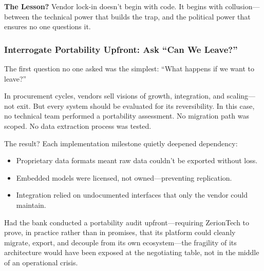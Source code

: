 \textbf{The Lesson?} Vendor lock-in doesn’t begin with code. It begins with collusion—between the technical power that builds the trap, and the political power that ensures no one questions it.


\subsubsection{Interrogate Portability Upfront: Ask “Can We Leave?”}

The first question no one asked was the simplest: “What happens if we want to leave?”  

In procurement cycles, vendors sell visions of growth, integration, and scaling—not exit. But every system should be evaluated for its reversibility. In this case, no technical team performed a portability assessment. No migration path was scoped. No data extraction process was tested.  

The result? Each implementation milestone quietly deepened dependency:  
\begin{itemize}
    \item Proprietary data formats meant raw data couldn’t be exported without loss.
    \item Embedded models were licensed, not owned—preventing replication.
    \item Integration relied on undocumented interfaces that only the vendor could maintain.
\end{itemize}

Had the bank conducted a portability audit upfront—requiring ZerionTech to prove, in practice rather than in promises, that its platform could cleanly migrate, export, and decouple from its own ecosystem—the fragility of its architecture would have been exposed at the negotiating table, not in the middle of an operational crisis.


